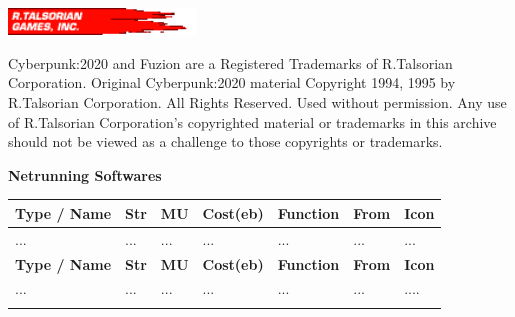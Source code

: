 \documentclass[11pt,twoside,a4paper]{article}
\begin{document}
\begin{multicols*}{2}
\includegraphics[width=5.00cm]{rTalsorianGamesInc-logo.png}

{\scriptsize Cyberpunk:2020 and Fuzion are a Registered Trademarks of R.Talsorian Corporation. Original Cyberpunk:2020 material Copyright 1994, 1995 by R.Talsorian Corporation. All Rights Reserved. Used without permission. Any use of R.Talsorian Corporation's copyrighted material or trademarks in this archive should not be viewed as a challenge to those copyrights or trademarks. }

\end{multicols*}

\clearpage

\begin{landscape}

\begin{center}
	\textbf{\LARGE Netrunning Softwares}
\end{center}

\begin{longtable}[ht]{ p{3.00cm} p{0.75cm} p{0.75cm} p{1.25cm} p{10.00cm} p{0.75cm} p{7.50cm} }
			
			\hline
			\rowcolor{lightgray}
				\textbf{Type / Name}		&	\textbf{Str}	&	\textbf{MU}		&	\textbf{Cost(eb)}	&	
						\textbf{Function}		&	\textbf{From}	&	\textbf{Icon}	\\
			\hline 
		\endfirsthead
			\hline
			\rowcolor{verylightgray} ... & ... &... & ... &... & ... & ... \\
			\hline
			\rowcolor{lightgray}
				\textbf{Type / Name}		&	\textbf{Str}	&	\textbf{MU}		&	\textbf{Cost(eb)}	&	
						\textbf{Function}		&	\textbf{From}	&	\textbf{Icon}	\\
			\hline
		\endhead
			\hline
			\rowcolor{verylightgray} ... & ... &... & ... &... & ... & .... \\
			\hline
		\endfoot
			\hline \hline
		\endlastfoot
		

\end{longtable}
\end{landscape}
\end{document}
